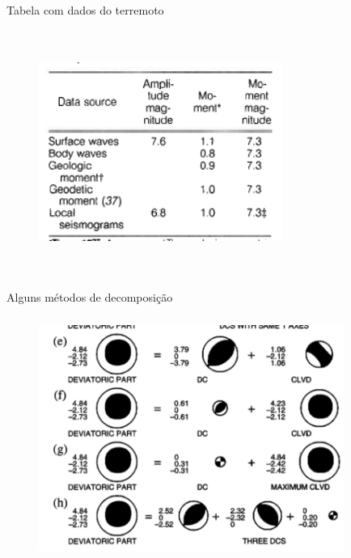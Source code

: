 \documentclass{beamer}
\begin{document}
\begin{frame}{Tabela com dados do terremoto}
	\begin{figure}[htb]
		\centering
		\includegraphics[width= 8cm, height= 8cm]{kanamori}
	\end{figure}
\end{frame}

\begin{frame}{Alguns métodos de decomposição}
	\begin{figure}[htb]
		\centering
		\includegraphics[width= 10cm, height= 8cm]{fig322}
	\end{figure}
\end{frame}
\end{document}
